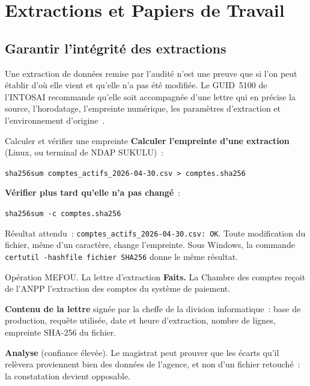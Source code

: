 \section{Extractions et Papiers de Travail}
\label{sec:c10-papiers}

\subsection{Garantir l'intégrité des extractions}

Une extraction de données remise par l'audité n'est une preuve que si l'on
peut établir d'où elle vient et qu'elle n'a pas été modifiée. Le GUID~5100
de l'INTOSAI recommande qu'elle soit accompagnée d'une lettre qui en
précise la source, l'horodatage, l'empreinte numérique, les paramètres
d'extraction et l'environnement d'origine~\cite{intosai2019guid5100}.

\begin{boxoutils}{Calculer et vérifier une empreinte}
\textbf{Calculer l'empreinte d'une extraction} (Linux, ou terminal de
NDAP SUKULU)~:

\texttt{sha256sum comptes\_actifs\_2026-04-30.csv > comptes.sha256}

\medskip
\textbf{Vérifier plus tard qu'elle n'a pas changé}~:

\texttt{sha256sum -c comptes.sha256}

\medskip
Résultat attendu~: \texttt{comptes\_actifs\_2026-04-30.csv: OK}. Toute
modification du fichier, même d'un caractère, change l'empreinte. Sous
Windows, la commande \texttt{certutil -hashfile fichier SHA256} donne le
même résultat.
\end{boxoutils}

\begin{boxscenario}{Opération MEFOU. La lettre d'extraction}
\textbf{Faits.} La Chambre des comptes reçoit de l'ANPP l'extraction des
comptes du système de paiement.

\medskip
\textbf{Contenu de la lettre} signée par la cheffe de la division
informatique~: base de production, requête utilisée, date et heure
d'extraction, nombre de lignes, empreinte SHA-256 du fichier.

\medskip
\textbf{Analyse} (confiance élevée). Le magistrat peut prouver que les écarts
qu'il relèvera proviennent bien des données de l'agence, et non d'un fichier
retouché~: la constatation devient opposable.
\end{boxscenario}

